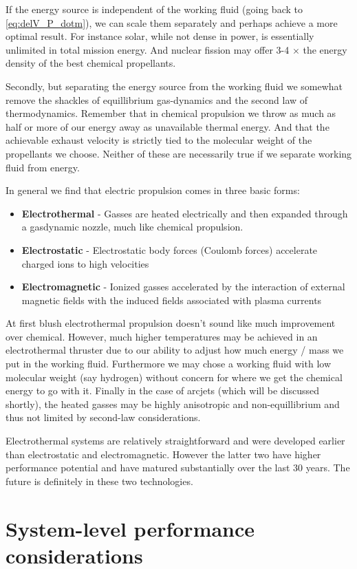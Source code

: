 \documentclass[twocolumn]{memoir} %
\begin{document}
If the energy source is independent of the working fluid (going back to \cref{eq:delV_P_dotm}), we can scale them separately and
perhaps achieve a more optimal result.  For instance solar, while not dense in power, is
essentially unlimited in total mission energy.  And nuclear fission may offer 3-4 $\times$
the energy density of the best chemical propellants.

Secondly, but separating the energy source from the working fluid we somewhat remove the
shackles of equillibrium gas-dynamics and the second law of thermodynamics.  Remember that
in chemical propulsion we throw as much as half or more of our energy away as unavailable 
thermal energy.  And that the achievable exhaust velocity is strictly tied to the molecular
weight of the propellants we choose.  Neither of these are necessarily true if we separate
working fluid from energy.

In general we find that electric propulsion comes in three basic forms:
\begin{itemize}
    \item \textbf{Electrothermal} - Gasses are heated electrically and then expanded through
        a gasdynamic nozzle, much like chemical propulsion.
    \item \textbf{Electrostatic} - Electrostatic body forces (Coulomb forces) accelerate charged
        ions to high velocities
    \item \textbf{Electromagnetic} - Ionized gasses accelerated by the interaction of external
        magnetic fields with the induced fields associated with plasma currents
\end{itemize}

At first blush electrothermal propulsion doesn't sound like much improvement over chemical.  However,
much higher temperatures may be achieved in an electrothermal thruster due to our ability to adjust
how much energy / mass we put in the working fluid.  Furthermore we may chose a working fluid with low
molecular weight (say hydrogen) without concern for where we get the chemical energy to go with it.
Finally in the case of arcjets (which will be discussed shortly), the heated gasses may be highly
anisotropic and non-equillibrium and thus not limited by second-law considerations.

Electrothermal systems are relatively straightforward and were developed earlier than electrostatic and
electromagnetic.  However the latter two have higher performance potential and have matured substantially
over the last 30 years.  The future is definitely in these two technologies.

\section{System-level performance considerations}



\end{document}

